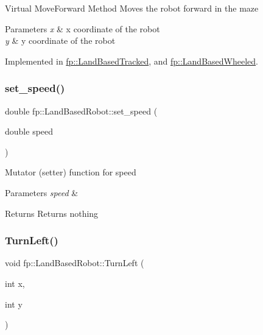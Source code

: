 Virtual Move\+Forward Method Moves the robot forward in the maze 
\begin{DoxyParams}{Parameters}
{\em x} & x coordinate of the robot \\
\hline
{\em y} & y coordinate of the robot \\
\hline
\end{DoxyParams}


Implemented in \hyperlink{classfp_1_1_land_based_tracked_a02145c5c1642c961f9c0cca1a4cf1b70}{fp\+::\+Land\+Based\+Tracked}, and \hyperlink{classfp_1_1_land_based_wheeled_a9c6a668ce9233468141516c8ea678593}{fp\+::\+Land\+Based\+Wheeled}.

\mbox{\label{classfp_1_1_land_based_robot_abddbc887170ed70d2c719cfdf9fed0b7}} 
\subsubsection{\texorpdfstring{set\+\_\+speed()}{set\_speed()}}
{\footnotesize\ttfamily double fp\+::\+Land\+Based\+Robot\+::set\+\_\+speed (\begin{DoxyParamCaption}\item[{double}]{speed }\end{DoxyParamCaption})\hspace{0.3cm}{\ttfamily [inline]}}

Mutator (setter) function for speed 
\begin{DoxyParams}{Parameters}
{\em speed} & \\
\hline
\end{DoxyParams}
\begin{DoxyReturn}{Returns}
Returns nothing 
\end{DoxyReturn}
\mbox{\label{classfp_1_1_land_based_robot_a359e1012e9093475b7a1b0d38e41a118}} 
\subsubsection{\texorpdfstring{Turn\+Left()}{TurnLeft()}}
{\footnotesize\ttfamily void fp\+::\+Land\+Based\+Robot\+::\+Turn\+Left (\begin{DoxyParamCaption}\item[{int}]{x,  }\item[{int}]{y }\end{DoxyParamCaption})\hspace{0.3cm}{\ttfamily [pure virtual]}}

